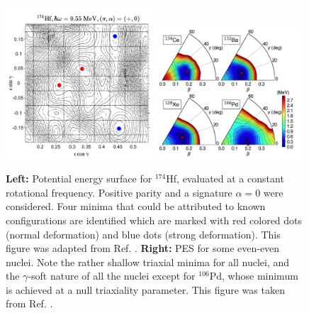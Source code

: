 \begin{figure}
    \centering
    \includegraphics[width=0.49\textwidth]{Chapters/Figures/174Hf-PES.pdf}
    \includegraphics[width=0.49\textwidth]{Chapters/Figures/even-A-PES.pdf}
    \caption{\textbf{Left:} Potential energy surface for $^{174}$Hf, evaluated at a constant rotational frequency. Positive parity and a signature $\alpha=0$ were considered. Four minima that could be attributed to known configurations are identified which are marked with red colored dots (normal deformation) and blue dots (strong deformation). This figure was adapted from Ref. \cite{djongolov2003extending}. \textbf{Right:} PES for some even-even nuclei. Note the rather shallow triaxial minima for all nuclei, and the $\gamma$-soft nature of all the nuclei except for $^{106}$Pd, whose minimum is achieved at a null triaxiality parameter. This figure was taken from Ref. \cite{nomura2021examining}.}
    \label{pes-example-set-1}
\end{figure}

